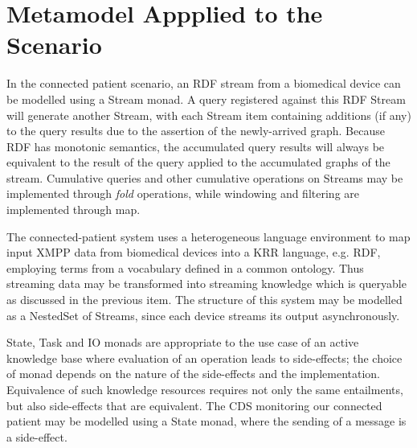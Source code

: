 \documentclass[runningheads]{llncs}
\begin{document}

\vspace{-0.4cm}
\section{Metamodel Appplied to the Scenario}
\label{sec:proof}

In the connected patient scenario, an RDF stream from a biomedical device can be modelled using a Stream monad.
A query registered against this RDF Stream will generate another Stream, with each Stream item containing additions (if any) to the query results due to the assertion of the newly-arrived graph.
Because RDF has monotonic semantics, the accumulated query results will always be equivalent to the result of the query applied to the accumulated graphs of the stream.
Cumulative queries and other cumulative operations on Streams may be implemented through \emph{fold} operations, while windowing and filtering are implemented through map.


The connected-patient system uses a heterogeneous language environment to map input XMPP data from biomedical devices into a KRR language, e.g. RDF, employing terms from a vocabulary defined in a common ontology. Thus streaming data may be transformed into streaming knowledge which is queryable as discussed in the previous item. The structure of this system may be modelled as a NestedSet of Streams, since each device streams its output asynchronously.

State, Task and IO monads are appropriate to the use case of an active knowledge base where evaluation of an operation leads to side-effects; the choice of monad depends on the nature of the side-effects and the implementation.
Equivalence of such knowledge resources requires not only the same entailments, but also side-effects that are  equivalent.
The CDS monitoring our connected patient may be modelled using a State monad, where the sending of a message is a side-effect.
\end{document}
